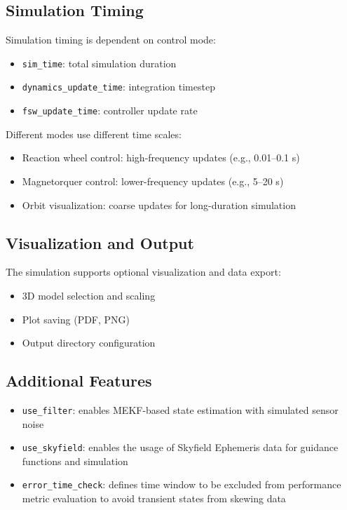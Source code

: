 \subsection{Simulation Timing}

Simulation timing is dependent on control mode:

\begin{itemize}
	\item \texttt{sim\_time}: total simulation duration
	\item \texttt{dynamics\_update\_time}: integration timestep
	\item \texttt{fsw\_update\_time}: controller update rate
\end{itemize}

Different modes use different time scales:

\begin{itemize}
	\item Reaction wheel control: high-frequency updates (e.g., 0.01–0.1 s)
	\item Magnetorquer control: lower-frequency updates (e.g., 5–20 s)
	\item Orbit visualization: coarse updates for long-duration simulation
\end{itemize}

\subsection{Visualization and Output}

The simulation supports optional visualization and data export:

\begin{itemize}
	\item 3D model selection and scaling
	\item Plot saving (PDF, PNG)
	\item Output directory configuration
\end{itemize}

\subsection{Additional Features}

\begin{itemize}
	\item \texttt{use\_filter}: enables MEKF-based state estimation with simulated sensor noise
	\item \texttt{use\_skyfield}: enables the usage of Skyfield Ephemeris data for guidance functions and simulation
	\item \texttt{error\_time\_check}: defines time window to be excluded from performance metric evaluation to avoid transient states from skewing data
\end{itemize}

